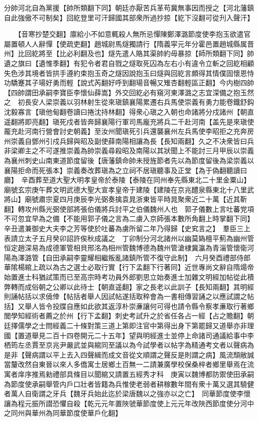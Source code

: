 分帥河北自為黨援【帥所類翻下同】朝廷亦厭苦兵革苟冀無事因而授之【河北藩鎮自此強傲不可制矣】回紇登里可汗歸國其部衆所過抄掠【紇下沒翻可從刋入聲汗】

　　【音寒抄楚交翻】廪給小不如意輒殺人無所忌憚陳鄭澤潞節度使李抱玉欲遣官屬置頓人人辭憚【使疏吏翻】趙城尉馬燧獨請行【隋義寜元年分霍邑置趙城縣属晋州】比回紇將至【比必利翻及也】燧先遣人賂其渠帥約毋暴掠【師所類翻下同】帥遺之旗曰【遺惟季翻】有犯令者君自戮之燧取死囚為左右小有違令立斬之回紇相顧失色涉其境者皆拱手遵約束抱玉奇之燧因說抱玉曰燧與回紇言頗得其情僕固懷恩恃功驕蹇其子瑒好勇而輕【說式芮翻好呼到翻瑒音暢又雉杏翻輕區正翻】今内樹四帥【四帥謂田承嗣李寶臣李懷仙薛嵩】外交回紇必有窺河東澤潞之志宜深備之抱玉然之　初長安人梁崇義以羽林射生從來瑱鎮襄陽累遷右兵馬使崇義有勇力能卷鐵舒鈎沈毅寡言【瑱他甸翻卷讀曰捲沈持林翻】得衆心瑱之入朝也命諸將分戍諸州【朝直遥翻將即亮翻】瑱死戍者皆奔歸襄陽行軍司馬龐充將兵二千赴河南【盖先是來瑱使龎充赴河南行營會討史朝義】至汝州聞瑱死引兵還襲襄州左兵馬使李昭拒之充奔房州崇義自鄧州引戍兵歸與昭及副使薛南陽相讓為長【長知兩翻】久之不决衆皆曰兵非梁卿主之不可遂推崇義為帥崇義尋殺昭及南陽以其狀聞上不能討三月甲辰以崇義為襄州刺史山南東道節度留後【唐藩鎮命帥未授旌節者先以為節度留後為梁崇義以襄陽拒命而死張本】崇義奏改葬瑱為之立祠不居瑱聽事及正堂【為于偽翻聽讀曰廳】　辛酉葬至道大聖大明孝皇帝於泰陵【泰陵在同州奉先縣東北二十里金粟山】廟號玄宗庚午葬文明武德大聖大宣孝皇帝于建陵【建陵在京兆醴泉縣東北十八里武將山】廟號肅宗夏四月庚辰李光弼奏擒袁晁浙東皆平時晁聚衆近二十萬【近其靳翻】轉攻州縣光弼使部將張伯儀將兵討平之伯儀魏州人也　郭子儀數上言吐蕃党項不可忽宜早為之備【不能用郭子儀之言為二虜入京師張本數所角翻上時掌翻下同】　辛丑遣兼御史大夫李之芳等使於吐蕃為虜所留二年乃得歸【史䆒言之】　羣臣三上表請立太子五月癸卯詔許俟秋成議之　丁卯制分河北諸州以幽莫媯檀平薊為幽州管恒定趙深易為成德軍管相貝邢洺為相州管魏博德為魏州管滄棣冀瀛為青淄管懷衛河陽為澤潞管【自田承嗣李靈耀相繼叛亂諸鎮所管不復守此制】　六月癸酉禮部侍郎華隂楊綰上疏以為古之選士必取行實【行下孟翻下行著同】近世專尚文辭自隋煬帝始置進士科猶試策而已至高宗時考功員外郎劉思立始奏進士加雜文明經加帖從此積弊轉而成俗朝之公卿以此待士【朝直遥翻】家之長老以此訓子【長知兩翻】其明經則誦帖括以求僥倖【帖括者舉人因試帖遂括取稡會為一書相傳習誦之以應試謂之帖括】又舉人皆令投牒自應如此欲其返淳朴崇亷讓何可得也請令縣令察孝亷取行著鄉閭學知經術者薦之於州【行下孟翻】刺史考試升之於省任各占一經【占之贍翻】朝廷擇儒學之士問經義二十條對策三道上第即注官中第得出身下第罷歸又道舉亦非理國【置道舉見二百十四卷開元二十五年】望與明經進士並停上命諸司通議給事中李栖筠左丞賈至京兆尹嚴武並與綰同至議以為今試學者以帖字為精通考文者以聲病為是非【聲病謂以平上去入四聲緝而成文音從文順謂之聲反是則謂之病】風流頹敝誠當釐改然自東晉以來人多僑寓士居鄉土百無一二請兼廣學校保桑梓者鄉里舉焉在流寓者庠序推焉勑禮部具條目以聞綰又請置五經秀才科　庚寅以魏博都防禦使田承嗣為節度使承嗣舉管内戶口壯者皆籍為兵惟使老弱者耕稼數年間有衆十萬又選其驍健者萬人自衛謂之牙兵【魏牙兵始此迄於梁唐魏以之強亦以之亡】　同華節度使李懷讓為程元振所譛恐懼自殺【乾元元年置陜虢華節度使上元元年改陜西節度使分河中之同州與華州為同華節度使華戶化翻】

